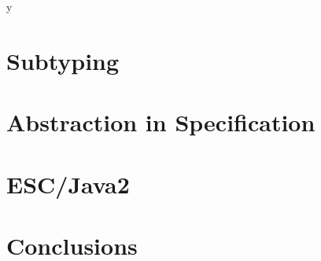 \if y\MAKEHANDOUTS \documentclass[compress,landscape,handout]{beamer}
\begin{document}

\section{Subtyping}

\section[Abstraction]{Abstraction in Specification}

\section[ESC]{ESC/Java2}

\section*{Conclusions}

\end{document}
